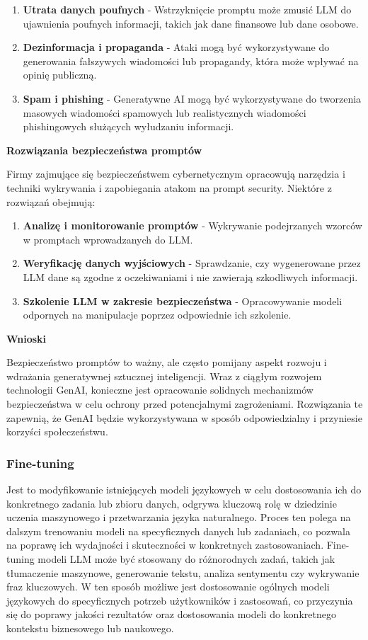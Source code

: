 \begin{enumerate}
    \item {\bf Utrata danych poufnych}
    - Wstrzyknięcie promptu może zmusić LLM do ujawnienia poufnych informacji, takich jak dane finansowe lub dane osobowe.
    \item {\bf Dezinformacja i propaganda}
    - Ataki mogą być wykorzystywane do generowania fałszywych wiadomości lub propagandy, która może wpływać na opinię publiczną.
    \item {\bf Spam i phishing}
    - Generatywne AI mogą być wykorzystywane do tworzenia masowych wiadomości spamowych lub realistycznych wiadomości phishingowych służących wyłudzaniu informacji.
\end{enumerate}


{\bf Rozwiązania bezpieczeństwa promptów}

\noindent Firmy zajmujące się bezpieczeństwem cybernetycznym opracowują narzędzia i techniki wykrywania i zapobiegania atakom na prompt security. Niektóre z rozwiązań obejmują:

\begin{enumerate}
    \item {\bf Analizę i monitorowanie promptów} - Wykrywanie podejrzanych wzorców w promptach wprowadzanych do LLM.
    \item {\bf Weryfikację danych wyjściowych} - Sprawdzanie, czy wygenerowane przez LLM dane są zgodne z oczekiwaniami i nie zawierają szkodliwych informacji.
    \item {\bf Szkolenie LLM w zakresie bezpieczeństwa} - Opracowywanie modeli odpornych na manipulacje poprzez odpowiednie ich szkolenie.
\end{enumerate}

{\bf Wnioski}

\noindent Bezpieczeństwo promptów to ważny, ale często pomijany aspekt rozwoju i wdrażania generatywnej sztucznej inteligencji. Wraz z ciągłym rozwojem technologii GenAI, konieczne jest opracowanie solidnych mechanizmów bezpieczeństwa w celu ochrony przed potencjalnymi zagrożeniami. Rozwiązania te zapewnią, że GenAI będzie wykorzystywana w sposób odpowiedzialny i przyniesie korzyści społeczeństwu.

\subsubsection{Fine-tuning}
Jest to modyfikowanie istniejących modeli językowych w celu dostosowania ich do konkretnego zadania lub zbioru danych, odgrywa kluczową rolę w dziedzinie uczenia maszynowego i przetwarzania języka naturalnego. Proces ten polega na dalszym trenowaniu modeli na specyficznych danych lub zadaniach, co pozwala na poprawę ich wydajności i skuteczności w konkretnych zastosowaniach. Fine-tuning modeli LLM może być stosowany do różnorodnych zadań, takich jak tłumaczenie maszynowe, generowanie tekstu, analiza sentymentu czy wykrywanie fraz kluczowych. W ten sposób możliwe jest dostosowanie ogólnych modeli językowych do specyficznych potrzeb użytkowników i zastosowań, co przyczynia się do poprawy jakości rezultatów oraz dostosowania modeli do konkretnego kontekstu biznesowego lub naukowego.

